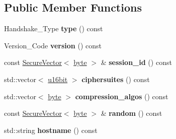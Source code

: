 \subsection*{Public Member Functions}
\begin{DoxyCompactItemize}
\item 
\hypertarget{classBotan_1_1Client__Hello_ae3825044d74008604d57a63fec650fd0}{Handshake\-\_\-\-Type {\bfseries type} () const }\label{classBotan_1_1Client__Hello_ae3825044d74008604d57a63fec650fd0}

\item 
\hypertarget{classBotan_1_1Client__Hello_a7a23ada89c05a3af49cd4ac78fc8ec6f}{Version\-\_\-\-Code {\bfseries version} () const }\label{classBotan_1_1Client__Hello_a7a23ada89c05a3af49cd4ac78fc8ec6f}

\item 
\hypertarget{classBotan_1_1Client__Hello_aa35cbf28a9e43d7c68b11041190e6ca8}{const \hyperlink{classBotan_1_1SecureVector}{Secure\-Vector}$<$ \hyperlink{namespaceBotan_a7d793989d801281df48c6b19616b8b84}{byte} $>$ \& {\bfseries session\-\_\-id} () const }\label{classBotan_1_1Client__Hello_aa35cbf28a9e43d7c68b11041190e6ca8}

\item 
\hypertarget{classBotan_1_1Client__Hello_a4ba039abd16bf6df1adc7a08cfbfb834}{std\-::vector$<$ \hyperlink{namespaceBotan_ab07face63a00c39ea6ed97f203ee501c}{u16bit} $>$ {\bfseries ciphersuites} () const }\label{classBotan_1_1Client__Hello_a4ba039abd16bf6df1adc7a08cfbfb834}

\item 
\hypertarget{classBotan_1_1Client__Hello_a839922374551437266bb4f73058b08f0}{std\-::vector$<$ \hyperlink{namespaceBotan_a7d793989d801281df48c6b19616b8b84}{byte} $>$ {\bfseries compression\-\_\-algos} () const }\label{classBotan_1_1Client__Hello_a839922374551437266bb4f73058b08f0}

\item 
\hypertarget{classBotan_1_1Client__Hello_a2d5fc4e0dfd83610dbd5d028e672df09}{const \hyperlink{classBotan_1_1SecureVector}{Secure\-Vector}$<$ \hyperlink{namespaceBotan_a7d793989d801281df48c6b19616b8b84}{byte} $>$ \& {\bfseries random} () const }\label{classBotan_1_1Client__Hello_a2d5fc4e0dfd83610dbd5d028e672df09}

\item 
\hypertarget{classBotan_1_1Client__Hello_ac47cacbd1ce2fbeb882f74a90081ff79}{std\-::string {\bfseries hostname} () const }\label{classBotan_1_1Client__Hello_ac47cacbd1ce2fbeb882f74a90081ff79}


\end{DoxyCompactItemize}
